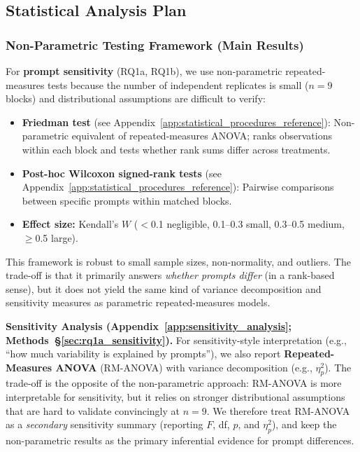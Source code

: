 \subsection{Statistical Analysis Plan}

\subsubsection{Non-Parametric Testing Framework (Main Results)}
\label{sec:nonparam_framework}

For \textbf{prompt sensitivity} (RQ1a, RQ1b), we use non-parametric repeated-measures tests because the number of independent replicates is small ($n=9$ blocks) and distributional assumptions are difficult to verify:
\begin{itemize}[noitemsep]
    \item \textbf{Friedman test} (see Appendix~\ref{app:statistical_procedures_reference}): Non-parametric equivalent of repeated-measures ANOVA; ranks observations within each block and tests whether rank sums differ across treatments.
    \item \textbf{Post-hoc Wilcoxon signed-rank tests} (see Appendix~\ref{app:statistical_procedures_reference}): Pairwise comparisons between specific prompts within matched blocks.
    \item \textbf{Effect size:} Kendall's $W$ ($<$0.1 negligible, 0.1--0.3 small, 0.3--0.5 medium, $\geq$0.5 large).
\end{itemize}

This framework is robust to small sample sizes, non-normality, and outliers. The trade-off is that it primarily answers \textit{whether prompts differ} (in a rank-based sense), but it does not yield the same kind of variance decomposition and sensitivity measures as parametric repeated-measures models.

\textbf{Sensitivity Analysis (Appendix~\ref{app:sensitivity_analysis}; Methods~\S\ref{sec:rq1a_sensitivity}).} For sensitivity-style interpretation (e.g., ``how much variability is explained by prompts''), we also report \textbf{Repeated-Measures ANOVA} (RM-ANOVA) with variance decomposition (e.g., $\eta^2_p$). The trade-off is the opposite of the non-parametric approach: RM-ANOVA is more interpretable for sensitivity, but it relies on stronger distributional assumptions that are hard to validate convincingly at $n=9$. We therefore treat RM-ANOVA as a \textit{secondary} sensitivity summary (reporting $F$, df, $p$, and $\eta^2_p$), and keep the non-parametric results as the primary inferential evidence for prompt differences.

